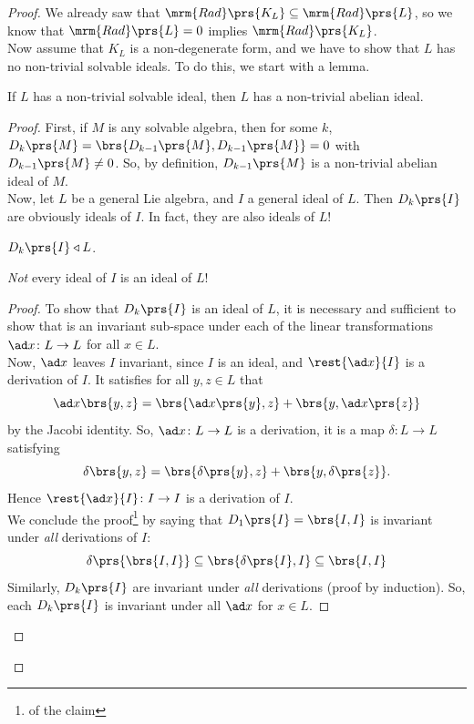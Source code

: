 \documentclass[10pt,a4paper,twoside,openany,hidelinks]{book}
\begin{document}
\begin{proof}
We already saw that $\mrm{Rad}\prs{K_L} \subseteq \mrm{Rad}\prs{L}$, so we know that $\mrm{Rad}\prs{L} = 0$ implies $\mrm{Rad}\prs{K_L}$.\\
Now assume that $K_L$ is a non-degenerate form, and we have to show that $L$ has  no non-trivial solvable ideals.
To do this, we start with a lemma.

\begin{lemma}
If $L$ has a non-trivial solvable ideal, then $L$ has a non-trivial abelian ideal.
\end{lemma}
\begin{proof}
First, if $M$ is any solvable algebra, then for some $k$, $D_k\prs{M} = \brs{D_{k-1}\prs{M}, D_{k-1}\prs{M}} = 0$ with $D_{k-1}\prs{M} \neq 0$. So, by definition, $D_{k-1}\prs{M}$ is a non-trivial abelian ideal of $M$.
\\
Now, let $L$ be a general Lie algebra, and $I$ a general ideal of $L$. Then $D_{k}\prs{I}$ are obviously ideals of $I$. In fact, they are also ideals of $L$!

\begin{claim}
$D_k\prs{I} \triangleleft L$.
\end{claim}

\begin{remark}
\emph{Not} every ideal of $I$ is an ideal of $L$!
\end{remark}

\begin{proof}%
To show that $D_k\prs{I}$ is an ideal of $L$, it is necessary and sufficient to show that is an invariant sub-space under each of the linear transformations $\ad x \colon L \to L$ for all $x \in L$.\\
Now, $\ad x$ leaves $I$ invariant, since $I$ is an ideal, and $\rest{\ad x}{I}$ is a derivation of $I$. It satisfies for all $y,z \in L$ that
\[\ad x\brs{y,z} = \brs{\ad x\prs{y}, z} + \brs{y, \ad x\prs{z}}\]
by the Jacobi identity. So, $\ad x \colon L \to L$ is a derivation, it is a map $\delta \colon L \to L$ satisfying \[\delta \brs{y,z} = \brs{\delta\prs{y}, z} + \brs{y, \delta\prs{z}}\text{.}\]
Hence $\rest{\ad x}{I} \colon I \to I$ is a derivation of $I$.\\
We conclude the proof\footnote{of the claim} by saying that $D_1\prs{I} = \brs{I,I}$ is invariant under \emph{all} derivations of $I$:
\[\delta\prs{\brs{I,I}} \subseteq \brs{\delta\prs{I},I} \subseteq \brs{I,I}\]
Similarly, $D_k\prs{I}$ are invariant under \emph{all} derivations (proof by induction). So, each $D_k\prs{I}$ is  invariant under all $\ad x$ for $x \in L$.
\end{proof}%


\end{proof}
\end{proof}
\end{document}
